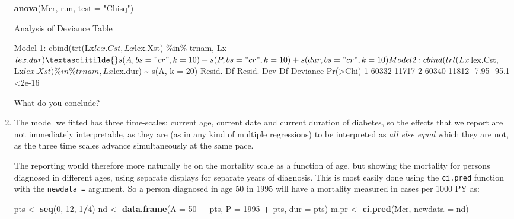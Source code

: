 \documentclass[
]{book}
\newenvironment{Shaded}{\begin{snugshade}}{\end{snugshade}}
\newcommand{\AttributeTok}[1]{\textcolor[rgb]{0.13,0.29,0.53}{#1}}
\newcommand{\DecValTok}[1]{\textcolor[rgb]{0.00,0.00,0.81}{#1}}
\newcommand{\FunctionTok}[1]{\textcolor[rgb]{0.13,0.29,0.53}{\textbf{#1}}}
\newcommand{\NormalTok}[1]{#1}
\newcommand{\OtherTok}[1]{\textcolor[rgb]{0.56,0.35,0.01}{#1}}
\newcommand{\SpecialCharTok}[1]{\textcolor[rgb]{0.81,0.36,0.00}{\textbf{#1}}}
\newcommand{\StringTok}[1]{\textcolor[rgb]{0.31,0.60,0.02}{#1}}
\begin{document}
\begin{enumerate}
\begin{Shaded}
\begin{Highlighting}[]
\FunctionTok{anova}\NormalTok{(Mcr, r.m, }\AttributeTok{test =} \StringTok{"Chisq"}\NormalTok{)}
\end{Highlighting}
\end{Shaded}

\begin{Shaded}
\begin{Highlighting}[]
\NormalTok{Analysis of Deviance Table}

\NormalTok{Model 1: cbind(trt(Lx$lex.Cst, Lx$lex.Xst) \%in\% trnam, Lx$lex.dur) \textasciitilde{} s(A, }
\NormalTok{    bs = "cr", k = 10) + s(P, bs = "cr", k = 10) + s(dur, bs = "cr", }
\NormalTok{    k = 10)}
\NormalTok{Model 2: cbind(trt(Lx$lex.Cst, Lx$lex.Xst) \%in\% trnam, Lx$lex.dur) \textasciitilde{} s(A, }
\NormalTok{    k = 20)}
\NormalTok{  Resid. Df Resid. Dev    Df Deviance Pr(\textgreater{}Chi)}
\NormalTok{1     60332      11717                        }
\NormalTok{2     60340      11812 {-}7.95    {-}95.1   \textless{}2e{-}16}
\end{Highlighting}
\end{Shaded}

  What do you conclude?
\item
  The model we fitted has three time-scales: current age, current
  date and current duration of diabetes, so the effects that we report
  are not immediately interpretable, as they are (as in any kind of
  multiple regressions) to be interpreted as \emph{all else equal} which
  they are not, as the three time scales advance simultaneously at the
  same pace.

  The reporting would therefore more naturally be on the
  mortality scale as a function of age, but showing the mortality
  for persons diagnosed in different ages, using separate displays
  for separate years of diagnosis.
  This is most easily done using the \texttt{ci.pred} function with
  the \texttt{newdata\ =} argument. So a person diagnosed in age 50 in
  1995 will have a mortality measured in cases per 1000 PY as:

\begin{Shaded}
\begin{Highlighting}[]
\NormalTok{pts }\OtherTok{\textless{}{-}} \FunctionTok{seq}\NormalTok{(}\DecValTok{0}\NormalTok{, }\DecValTok{12}\NormalTok{, }\DecValTok{1}\SpecialCharTok{/}\DecValTok{4}\NormalTok{)}
\NormalTok{nd }\OtherTok{\textless{}{-}} \FunctionTok{data.frame}\NormalTok{(}\AttributeTok{A =} \DecValTok{50}   \SpecialCharTok{+}\NormalTok{ pts, }
                 \AttributeTok{P =} \DecValTok{1995} \SpecialCharTok{+}\NormalTok{ pts, }
               \AttributeTok{dur =}\NormalTok{        pts)}
\NormalTok{m.pr }\OtherTok{\textless{}{-}} \FunctionTok{ci.pred}\NormalTok{(Mcr, }\AttributeTok{newdata =}\NormalTok{ nd)}
\end{Highlighting}
\end{Shaded}


\end{enumerate}
\end{document}

